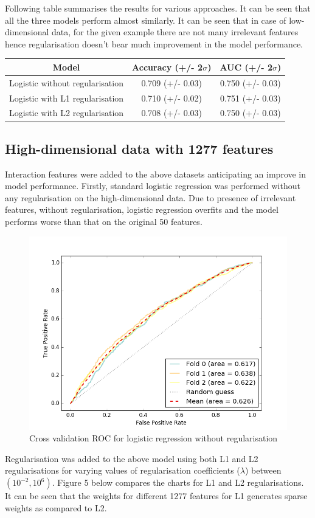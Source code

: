\documentclass[paper=a4,fontsize=12pt]{article}
\begin{document}
Following table summarises the results for various approaches. It can be seen that all the three models perform almost similarly. It can be seen that in case of low-dimensional data, for the given example there are not many irrelevant features hence regularisation doesn't bear much improvement in the model performance. \\

\begin{center}
\large
\begin{tabular}{ | c | c | c | } 
\hline
Model & Accuracy (+/- 2$\sigma$) & AUC (+/- 2$\sigma$) \\ 
\hline
Logistic without regularisation & 0.709 (+/- 0.03) & 0.750 (+/- 0.03) \\ 
Logistic with L1 regularisation & 0.710 (+/- 0.02) & 0.751 (+/- 0.03) \\ 
Logistic with L2 regularisation & 0.708 (+/- 0.03) & 0.750 (+/- 0.03) \\ 
\hline
\end{tabular}
\end{center}


\clearpage
\subsection{High-dimensional data with 1277 features}
Interaction features were added to the above datasets anticipating an improve in model performance. Firstly, standard logistic regression was performed without any regularisation on the high-dimensional data. Due to presence of irrelevant features, without regularisation, logistic regression overfits and the model performs worse than that on the original 50 features.
\begin{figure}[H]
\centering
\includegraphics[width=0.5\linewidth]{04_noregularisation_hf}
\caption{Cross validation ROC for logistic regression without regularisation}
\end{figure}

Regularisation was added to the above model using both L1 and L2 regularisations for varying values of regularisation coefficients ($\lambda$) between $(10^{-2},10^6)$. Figure 5 below compares the charts for L1 and L2 regularisations. It can be seen that the weights for different 1277 features for L1 generates sparse weights as compared to L2.
\end{document}
